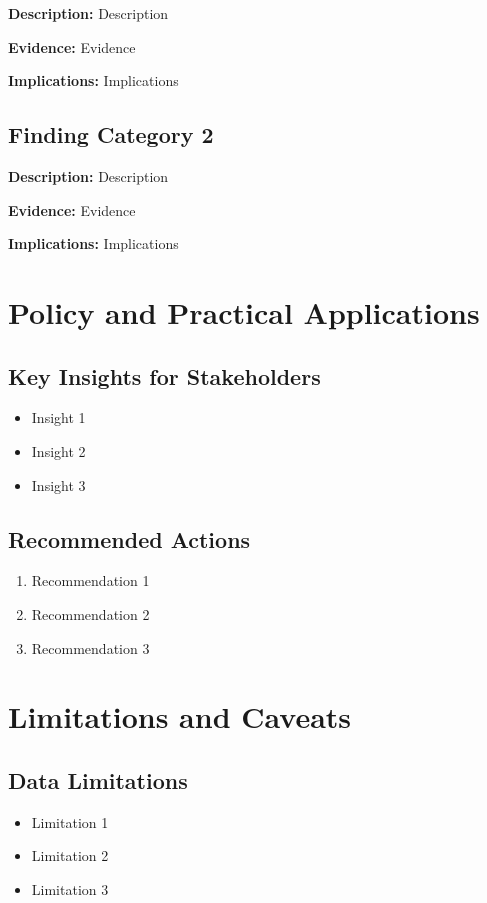 \documentclass[11pt,letterpaper]{article}
\begin{document}
\textbf{Description:} Description

\textbf{Evidence:} Evidence

\textbf{Implications:} Implications

\subsection{Finding Category 2}

\textbf{Description:} Description

\textbf{Evidence:} Evidence

\textbf{Implications:} Implications

\section{Policy and Practical Applications}

\subsection{Key Insights for Stakeholders}
\begin{itemize}
    \item Insight 1
    \item Insight 2
    \item Insight 3
\end{itemize}

\subsection{Recommended Actions}
\begin{enumerate}
    \item Recommendation 1
    \item Recommendation 2
    \item Recommendation 3
\end{enumerate}

\section{Limitations and Caveats}

\subsection{Data Limitations}
\begin{itemize}
    \item Limitation 1
    \item Limitation 2
    \item Limitation 3
\end{itemize}
\end{document}
